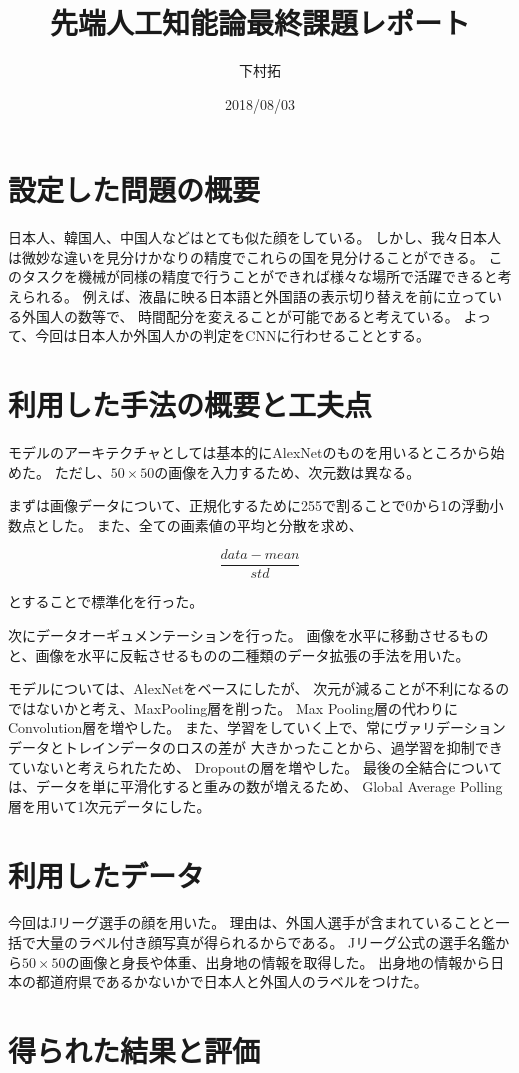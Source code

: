 \documentclass[uplatex]{jsarticle}
\begin{document}
\title{先端人工知能論最終課題レポート}
\author{下村拓}
\date{2018/08/03}
\maketitle


\section{設定した問題の概要}
日本人、韓国人、中国人などはとても似た顔をしている。
しかし、我々日本人は微妙な違いを見分けかなりの精度でこれらの国を見分けることができる。
このタスクを機械が同様の精度で行うことができれば様々な場所で活躍できると考えられる。
例えば、液晶に映る日本語と外国語の表示切り替えを前に立っている外国人の数等で、
時間配分を変えることが可能であると考えている。
よって、今回は日本人か外国人かの判定をCNNに行わせることとする。


\section{利用した手法の概要と工夫点}
モデルのアーキテクチャとしては基本的にAlexNetのものを用いるところから始めた。
ただし、$50\times50$の画像を入力するため、次元数は異なる。

まずは画像データについて、正規化するために255で割ることで0から1の浮動小数点とした。
また、全ての画素値の平均と分散を求め、

\begin{equation}
  \frac{data - mean}{std}
\end{equation}

とすることで標準化を行った。

次にデータオーギュメンテーションを行った。
画像を水平に移動させるものと、画像を水平に反転させるものの二種類のデータ拡張の手法を用いた。

モデルについては、AlexNetをベースにしたが、
次元が減ることが不利になるのではないかと考え、MaxPooling層を削った。
Max Pooling層の代わりにConvolution層を増やした。
また、学習をしていく上で、常にヴァリデーションデータとトレインデータのロスの差が
大きかったことから、過学習を抑制できていないと考えられたため、
Dropoutの層を増やした。
最後の全結合については、データを単に平滑化すると重みの数が増えるため、
Global Average Polling層を用いて1次元データにした。


\section{利用したデータ}
今回はJリーグ選手の顔を用いた。
理由は、外国人選手が含まれていることと一括で大量のラベル付き顔写真が得られるからである。
Jリーグ公式の選手名鑑から$50\times50$の画像と身長や体重、出身地の情報を取得した。
出身地の情報から日本の都道府県であるかないかで日本人と外国人のラベルをつけた。


\section{得られた結果と評価}
\end{document}
